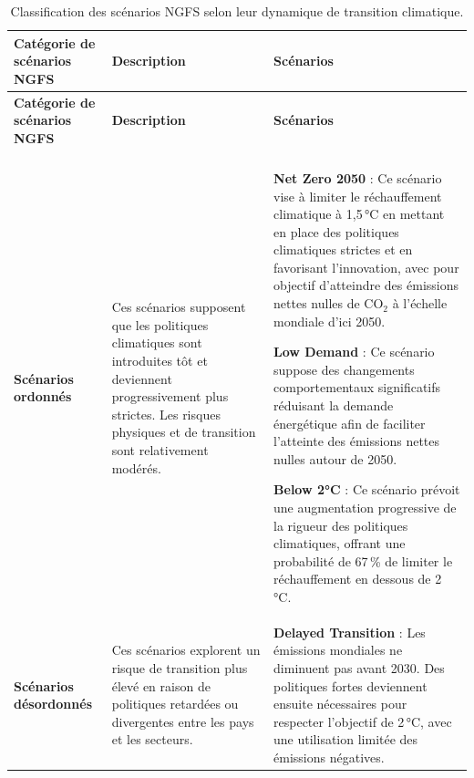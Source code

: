 \documentclass[11pt,a4paper]{article}
\renewcommand{\arraystretch}{1.4}
\newcommand{\tablehead}[1]{\textcolor{nxnavy}{\sffamily\bfseries\small #1}}
\begin{document}
\small
\renewcommand{\arraystretch}{1.3}

\begin{longtable}{>{\raggedright\arraybackslash}p{3.0cm} >{\raggedright\arraybackslash}p{4.0cm} >{\raggedright\arraybackslash}p{7.4cm}}

\caption{Classification des scénarios NGFS selon leur dynamique de transition climatique.}
\label{tab:ngfs_scenarios} \\

\toprule
\tablehead{Catégorie de scénarios NGFS} &
\tablehead{Description} &
\tablehead{Scénarios} \\ 
\midrule
\endfirsthead

\toprule
\tablehead{Catégorie de scénarios NGFS} &
\tablehead{Description} &
\tablehead{Scénarios} \\ 
\midrule
\endhead

\midrule
\multicolumn{3}{r}{\textit{Suite page suivante}} \\
\midrule
\endfoot

\bottomrule
\endlastfoot

\textbf{Scénarios ordonnés} &
Ces scénarios supposent que les politiques climatiques sont introduites tôt et deviennent progressivement plus strictes. Les risques physiques et de transition sont relativement modérés. &
\textbf{Net Zero 2050} : Ce scénario vise à limiter le réchauffement climatique à 1,5\,°C en mettant en place des politiques climatiques strictes et en favorisant l’innovation, avec pour objectif d’atteindre des émissions nettes nulles de CO$_2$ à l’échelle mondiale d’ici 2050.

\vspace{0.2cm}
\textbf{Low Demand} : Ce scénario suppose des changements comportementaux significatifs réduisant la demande énergétique afin de faciliter l’atteinte des émissions nettes nulles autour de 2050.

\vspace{0.2cm}
\textbf{Below 2°C} : Ce scénario prévoit une augmentation progressive de la rigueur des politiques climatiques, offrant une probabilité de 67\,\% de limiter le réchauffement en dessous de 2\,°C. \\

\midrule

\textbf{Scénarios désordonnés} &
Ces scénarios explorent un risque de transition plus élevé en raison de politiques retardées ou divergentes entre les pays et les secteurs. &
\textbf{Delayed Transition} : Les émissions mondiales ne diminuent pas avant 2030. Des politiques fortes deviennent ensuite nécessaires pour respecter l’objectif de 2\,°C, avec une utilisation limitée des émissions négatives. \\


\end{longtable}
\end{document}
